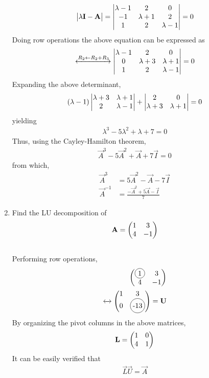 \documentclass[journal,12pt,twocolumn]{IEEEtran}
\renewcommand\thesection{\arabic{section}}
\begin{document}
\begin{enumerate}[label=\thesection.\arabic*.,ref=\thesection.\theenumi]
\begin{align}
	\begin{vmatrix}\lambda \mathbf{I} -	\mathbf{A}\end{vmatrix} = 	\begin{vmatrix}\lambda-1 & 2 & 0\\-1 & \lambda+1 & 2 \\ 1 & 2 & \lambda -1\end{vmatrix} = 0
	\end{align}
	Doing row operations the above equation can be expressed as
\begin{align}
	\xleftrightarrow[]{R_2 \leftarrow R_2 + R_3}
 	\begin{vmatrix}\lambda-1 & 2 & 0\\0 & \lambda+3 & \lambda + 1 \\ 1 & 2 & \lambda -1\end{vmatrix} = 0
	\end{align}
	Expanding the above determinant, 
\begin{align}
	\left(\lambda-1 \right)	\begin{vmatrix}\lambda+3 & \lambda + 1 \\  2 & \lambda -1\end{vmatrix} +
 \begin{vmatrix}2 & 0\\\lambda+3 & \lambda + 1 \end{vmatrix} = 0
	\end{align}
	yielding
\begin{align}
	\lambda^3 -5\lambda^2 + \lambda +7 = 0
\end{align}
Thus, using the Cayley-Hamilton theorem, 
\begin{align}
	\vec{A}^3 -5\vec{A}^2 + \vec{A} +7\vec{I} = 0
\end{align}
from which, 
\begin{align}
	\vec{A}^3 &= 5\vec{A}^2 - \vec{A} -7\vec{I} 
	\\
	\vec{A}^{-1} &= \frac{-\vec{A}^ 2 + 5\vec{A} - \vec{I} }{7}
\end{align}
\item Find the LU decomposition of 
\begin{align}
	\mathbf{A} = 	\begin{pmatrix}1 &  3\\ 4 & -1\end{pmatrix} 
\end{align}
\\
\solution Performing row operations, 
\begin{align}
	\myvec{\circled{1} &  3\\ 4 & -1} 
	\\
	\xleftrightarrow[]{}
	\myvec{1 &  3\\ 0 & \circled{-13}}  = \vec{U}
\end{align}
By organizing the pivot columns in the above matrices, 
\begin{align}
	\mathbf{L}=	\begin{pmatrix}1 &  0\\ 4 & 1\end{pmatrix} 
\end{align}
It can be easily verified that 
\begin{align}
\vec{L}\vec{U}=	\vec{A} 

\end{align}
\end{enumerate}
\end{document}
